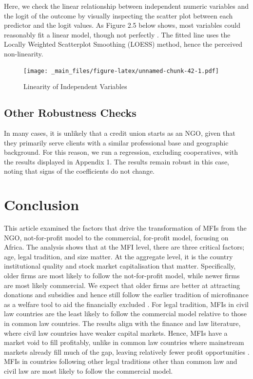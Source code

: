 \documentclass[a4paper, nobind]{templates/ociamthesis}
\begin{document}
Here, we check the linear relationship between independent numeric variables and the logit of the outcome by visually inspecting the scatter plot between each predictor and the logit values. As Figure 2.5 below shows, most variables could reasonably fit a linear model, though not perfectly \autocite{cheng2007testing}. The fitted line uses the Locally Weighted Scatterplot Smoothing (LOESS) method, hence the perceived non-linearity.

\begin{landscape}

\begin{figure}
\centering
\texttt{[image: \_main\_files/figure-latex/unnamed-chunk-42-1.pdf]}
\caption{\label{fig:unnamed-chunk-42}Linearity of Independent Variables}
\end{figure}

\end{landscape}

\hypertarget{other-robustness-checks}{%
\subsection{Other Robustness Checks}\label{other-robustness-checks}}

In many cases, it is unlikely that a credit union starts as an NGO, given that they primarily serve clients with a similar professional base and geographic background. For this reason, we run a regression, excluding cooperatives, with the results displayed in Appendix 1. The results remain robust in this case, noting that signs of the coefficients do not change.

\hypertarget{conclusion}{%
\section{Conclusion}\label{conclusion}}

This article examined the factors that drive the transformation of MFIs from the NGO, not-for-profit model to the commercial, for-profit model, focusing on Africa. The analysis shows that at the MFI level, there are three critical factors; age, legal tradition, and size matter. At the aggregate level, it is the country institutional quality and stock market capitalisation that matter. Specifically, older firms are most likely to follow the not-for-profit model, while newer firms are most likely commercial. We expect that older firms are better at attracting donations and subsidies and hence still follow the earlier tradition of microfinance as a welfare tool to aid the financially excluded \autocite{d2017ngos}. For legal tradition, MFIs in civil law countries are the least likely to follow the commercial model relative to those in common law countries. The results align with the finance and law literature, where civil law countries have weaker capital markets. Hence, MFIs have a market void to fill profitably, unlike in common law countries where mainstream markets already fill much of the gap, leaving relatively fewer profit opportunities \autocite{la2013law,schnyder2018twenty}. MFIs in countries following other legal traditions other than common law and civil law are most likely to follow the commercial model.
\end{document}
